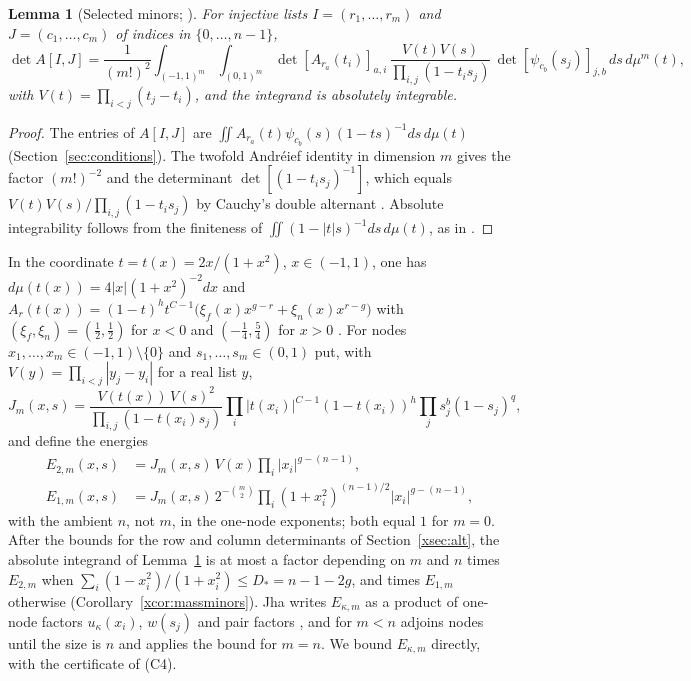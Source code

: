 \documentclass[11pt]{article}
\newtheorem{lemma}[theorem]{Lemma}
\theoremstyle{definition}
\begin{document}
\begin{lemma}[Selected minors; {\cite[Lemma~6.1]{Jha}}]\label{xlem:selected}
For injective lists $I=(r_1,\dots,r_m)$ and $J=(c_1,\dots,c_m)$ of indices in $\{0,\dots,n-1\}$,
\[
\det A[I,J]=\frac1{(m!)^2}\int_{(-1,1)^m}\int_{(0,1)^m}\det[A_{r_a}(t_i)]_{a,i}\,\frac{V(t)V(s)}{\prod_{i,j}(1-t_is_j)}\,\det[\psi_{c_b}(s_j)]_{j,b}\,ds\,d\mu^m(t),
\]
with $V(t)=\prod_{i<j}(t_j-t_i)$, and the integrand is absolutely integrable.
\end{lemma}

\begin{proof}
The entries of $A[I,J]$ are $\iint A_{r_a}(t)\psi_{c_b}(s)(1-ts)^{-1}ds\,d\mu(t)$ (Section~\ref{sec:conditions}). The twofold Andr\'eief identity in dimension $m$ gives the factor $(m!)^{-2}$ and the determinant $\det[(1-t_is_j)^{-1}]$, which equals $V(t)V(s)/\prod_{i,j}(1-t_is_j)$ by Cauchy's double alternant \cite[Eq.~(63)]{OAI}. Absolute integrability follows from the finiteness of $\iint(1-|t|s)^{-1}ds\,d\mu(t)$, as in \cite[Sec.~5.1]{OAI}.
\end{proof}

In the coordinate $t=t(x)=2x/(1+x^2)$, $x\in(-1,1)$, one has $d\mu(t(x))=4|x|(1+x^2)^{-2}dx$ and $A_r(t(x))=(1-t)^ht^{C-1}\big(\xi_f(x)x^{g-r}+\xi_n(x)x^{r-g}\big)$ with $(\xi_f,\xi_n)=(\frac12,\frac12)$ for $x<0$ and $(-\frac14,\frac54)$ for $x>0$ \cite[Sec.~5.1]{OAI}. For nodes $x_1,\dots,x_m\in(-1,1)\setminus\{0\}$ and $s_1,\dots,s_m\in(0,1)$ put, with $V(y)=\prod_{i<j}|y_j-y_i|$ for a real list $y$,
\[
J_m(x,s)=\frac{V(t(x))\,V(s)^2}{\prod_{i,j}(1-t(x_i)s_j)}\prod_i|t(x_i)|^{C-1}(1-t(x_i))^h\prod_js_j^b(1-s_j)^{q},
\]
and define the energies \cite[Eqs.~(5.1)--(5.3)]{Jha}
\[
\begin{aligned}E_{2,m}(x,s)&=J_m(x,s)\,V(x)\prod_i|x_i|^{g-(n-1)},\\ E_{1,m}(x,s)&=J_m(x,s)\,2^{-\binom m2}\prod_i(1+x_i^2)^{(n-1)/2}|x_i|^{g-(n-1)},\end{aligned}
\]
with the ambient $n$, not $m$, in the one-node exponents; both equal $1$ for $m=0$. After the bounds for the row and column determinants of Section~\ref{xsec:alt}, the absolute integrand of Lemma~\ref{xlem:selected} is at most a factor depending on $m$ and $n$ times $E_{2,m}$ when $\sum_i(1-x_i^2)/(1+x_i^2)\le D_*=n-1-2g$, and times $E_{1,m}$ otherwise (Corollary~\ref{xcor:massminors}). Jha writes $E_{\kappa,m}$ as a product of one-node factors $u_\kappa(x_i)$, $w(s_j)$ and pair factors \cite[Eq.~(5.8)]{Jha}, and for $m<n$ \cite[Proposition~5.4]{Jha} adjoins nodes until the size is $n$ and applies the bound for $m=n$. We bound $E_{\kappa,m}$ directly, with the certificate of (C4).
\end{document}
